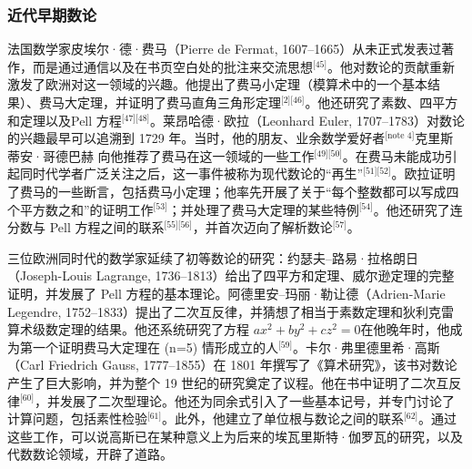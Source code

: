 \subsubsection{近代早期数论}
法国数学家皮埃尔·德·费马（Pierre de Fermat, 1607–1665）从未正式发表过著作，而是通过通信以及在书页空白处的批注来交流思想\(^\text{[45]}\)。他对数论的贡献重新激发了欧洲对这一领域的兴趣。他提出了费马小定理（模算术中的一个基本结果）、费马大定理，并证明了费马直角三角形定理\(^\text{[2][46]}\)。他还研究了素数、四平方和定理以及Pell 方程\(^\text{[47][48]}\)。莱昂哈德·欧拉（Leonhard Euler, 1707–1783）对数论的兴趣最早可以追溯到 1729 年。当时，他的朋友、业余数学爱好者\(^\text{[note 4]}\)克里斯蒂安·哥德巴赫 向他推荐了费马在这一领域的一些工作\(^\text{[49][50]}\)。在费马未能成功引起同时代学者广泛关注之后，这一事件被称为现代数论的“再生”\(^\text{[51][52]}\)。欧拉证明了费马的一些断言，包括费马小定理；他率先开展了关于“每个整数都可以写成四个平方数之和”的证明工作\(^\text{[53]}\)；并处理了费马大定理的某些特例\(^\text{[54]}\)。他还研究了连分数与 Pell 方程之间的联系\(^\text{[55][56]}\)，并首次迈向了解析数论\(^\text{[57]}\)。

三位欧洲同时代的数学家延续了初等数论的研究：约瑟夫–路易·拉格朗日（Joseph-Louis Lagrange, 1736–1813）给出了四平方和定理、威尔逊定理的完整证明，并发展了 Pell 方程的基本理论。阿德里安–玛丽·勒让德（Adrien-Marie Legendre, 1752–1833）提出了二次互反律，并猜想了相当于素数定理和狄利克雷算术级数定理的结果。他还系统研究了方程
$ ax^{2} + by^{2} + cz^{2} = 0$在他晚年时，他成为第一个证明费马大定理在 (n=5) 情形成立的人\(^\text{[59]}\)。卡尔·弗里德里希·高斯（Carl Friedrich Gauss, 1777–1855）在 1801 年撰写了《算术研究》，该书对数论产生了巨大影响，并为整个 19 世纪的研究奠定了议程。他在书中证明了二次互反律\(^\text{[60]}\)，并发展了二次型理论。他还为同余式引入了一些基本记号，并专门讨论了计算问题，包括素性检验\(^\text{[61]}\)。此外，他建立了单位根与数论之间的联系\(^\text{[62]}\)。通过这些工作，可以说高斯已在某种意义上为后来的埃瓦里斯特·伽罗瓦的研究，以及代数数论领域，开辟了道路。


